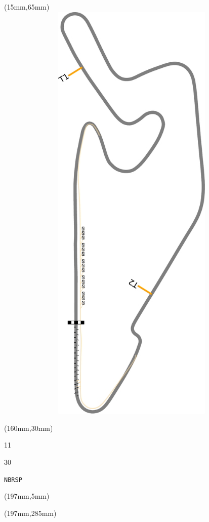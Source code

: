\begin{textblock*}{185mm}(15mm,65mm)%
\centering
\mbox{\includegraphics[width=185mm,height=210mm,keepaspectratio]{PT/NBRSP.pdf}}
\end{textblock*}
\begin{textblock*}{40mm}(160mm,30mm)%
\Large
\par{} 
\par11 
\par30 
\par\hfill\tiny\tt NBRSP\\
\end{textblock*}
\begin{textblock*}{20mm}(197mm,5mm)%
\fbox{\thepage}
\label{NBRSP}
\end{textblock*}
\begin{textblock*}{20mm}(197mm,285mm)%
\fbox{\thepage}
\end{textblock*}

